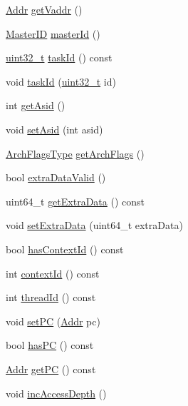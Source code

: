 \begin{DoxyCompactItemize}
\item 
\hyperlink{base_2types_8hh_af1bb03d6a4ee096394a6749f0a169232}{Addr} \hyperlink{classRequest_a68d2230b37b30d25462093fefdd813ac}{getVaddr} ()
\item 
\hyperlink{request_8hh_ac366b729262fd8e7cbd3283da6f775cf}{MasterID} \hyperlink{classRequest_a9b7d32db0521388c0953e531c79aab50}{masterId} ()
\item 
\hyperlink{Type_8hh_a435d1572bf3f880d55459d9805097f62}{uint32\_\-t} \hyperlink{classRequest_a7abf15d67b3fbd53236fde58eecb3f34}{taskId} () const 
\item 
void \hyperlink{classRequest_a5980a3ad18eeedbec785527bbab54317}{taskId} (\hyperlink{Type_8hh_a435d1572bf3f880d55459d9805097f62}{uint32\_\-t} id)
\item 
int \hyperlink{classRequest_a7851b2fdca6855f205dba9b17bbeeb09}{getAsid} ()
\item 
void \hyperlink{classRequest_aef60755a55f22e515c1772adcc208919}{setAsid} (int asid)
\item 
\hyperlink{classRequest_a50db53f1e2a3c758ce63d2a6046d8888}{ArchFlagsType} \hyperlink{classRequest_aefd0ec4015a880de7bbf555b15e242b1}{getArchFlags} ()
\item 
bool \hyperlink{classRequest_a6ef1621224aaaeb6f49afe60522f48ab}{extraDataValid} ()
\item 
uint64\_\-t \hyperlink{classRequest_af848a06a731668855b203d679077623d}{getExtraData} () const 
\item 
void \hyperlink{classRequest_ac73800a0bae4776befb9d416e95ea6d9}{setExtraData} (uint64\_\-t extraData)
\item 
bool \hyperlink{classRequest_a2b2cd3fd53b1fb8c401187ca87f810f5}{hasContextId} () const 
\item 
int \hyperlink{classRequest_a651d5d14e7a4e95ebe6d7f5b8ee5a107}{contextId} () const 
\item 
int \hyperlink{classRequest_afc38d04c77e7b5fc3bbb0dd00fc87742}{threadId} () const 
\item 
void \hyperlink{classRequest_a26bcddb177835052e51f3accb1d2dea7}{setPC} (\hyperlink{base_2types_8hh_af1bb03d6a4ee096394a6749f0a169232}{Addr} pc)
\item 
bool \hyperlink{classRequest_a0ae031e5463fc62226d112dfbad6c08c}{hasPC} () const 
\item 
\hyperlink{base_2types_8hh_af1bb03d6a4ee096394a6749f0a169232}{Addr} \hyperlink{classRequest_ab651e5db13fd546a5d4f88d3a4a04428}{getPC} () const 
\item 
void \hyperlink{classRequest_ad0fbbce566d827662e10f495bae4d421}{incAccessDepth} ()

\end{DoxyCompactItemize}
